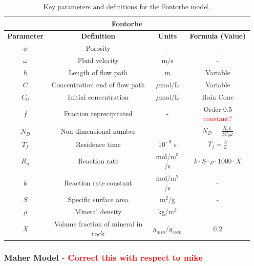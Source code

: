 \begin{table}[h]
    \centering
    \renewcommand{\arraystretch}{1.3} %
    \begin{tabular}{|c|c|c|c|}
        \hline
        \multicolumn{4}{|c|}{\textbf{Fontorbe}} \\  
        \hline
        \textbf{Parameter} & \textbf{Definition} & \textbf{Units} & \textbf{Formula (Value)} \\  
        \hline
        $\phi$ & Porosity & - & - \\
        $\omega$ & Fluid velocity & m/s & - \\
        $h$ & Length of flow path & m & Variable \\
        $C$ & Concentration \@ end of flow path & $\mu$mol/L & Variable \\
        $C_0$ & Initial concentration & $\mu$mol/L & Rain Conc \\
        $f$ & Fraction reprecipitated & - & Order 0.5 \textcolor{red}{constant?}\\
        $N_D$ & Non-dimensional number & - & $N_D = \frac{R_n h}{\phi C_0 \omega}$ \\
        $T_f$ & Residence time & $10^{-9}$ s & $T_f = \frac{h}{\omega}$ \\
        $R_n$ & Reaction rate & mol/m$^3$/s & $k\cdot S \cdot \rho \cdot 1000 \cdot X $ \\
        $k$ & Reaction rate constant & mol/m$^2$/s & - \\
        $S$ & Specific surface area & m$^2$/g & - \\
        $\rho$ & Mineral density & kg/m$^3$ &  \\
        $X$ & Volume fraction of mineral in rock & $g_{min}/g_{rock}$ & 0.2 \\
        \hline
    \end{tabular}
    \caption{Key parameters and definitions for the Fontorbe model.}
    \label{tab:parameters1}
\end{table}


\FloatBarrier









\newpage




\subsubsection{Maher Model - \textcolor{red}{Correct this with respect to mike}}



